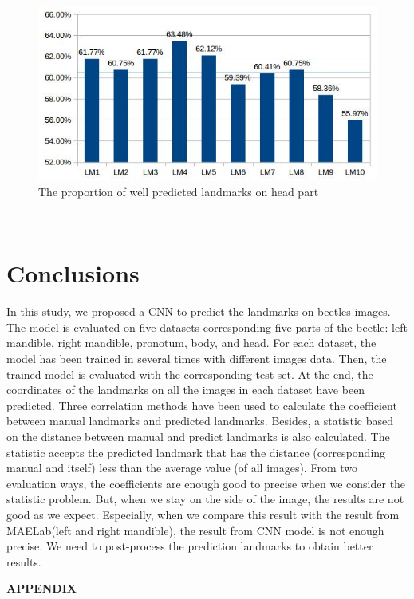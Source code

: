 \documentclass[12pt,a4paper]{article}
\begin{document}
\begin{figure}[h!]
	\centering
	\includegraphics[scale=0.65]{images/tete}
	\caption{The proportion of well predicted landmarks on head part}
	\label{tetefig}
\end{figure}~\\

\section{Conclusions}
In this study, we proposed a CNN to predict the landmarks on beetles images. The model is evaluated on five datasets corresponding five parts of the beetle: left mandible, right mandible, pronotum, body, and head. For each dataset, the model has been trained in several times with different images data. Then, the trained model is evaluated with the corresponding test set. At the end, the coordinates of the landmarks on all the images in each dataset have been predicted. Three correlation methods have been used to calculate the coefficient between manual landmarks and predicted landmarks. Besides, a statistic based on the distance between manual and predict landmarks is also calculated. The statistic accepts the predicted landmark that has the distance (corresponding manual and itself) less than the average value (of all images). From two evaluation ways, the coefficients are enough good to precise when we consider the statistic problem. But, when we stay on the side of the image, the results are not good as we expect. Especially, when we compare this result with the result from MAELab(left and right mandible), the result from CNN model is not enough precise. We need to post-process the prediction landmarks to obtain better results.


\pagebreak
\appendix
\begin{center}
\textbf{\LARGE{APPENDIX}}
\end{center}
\end{document}
